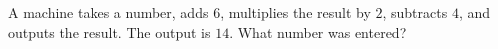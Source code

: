 A machine takes a number, adds $6$, multiplies the result by $2$, subtracts $4$, and outputs the result. The output is $14$. What number was entered?
